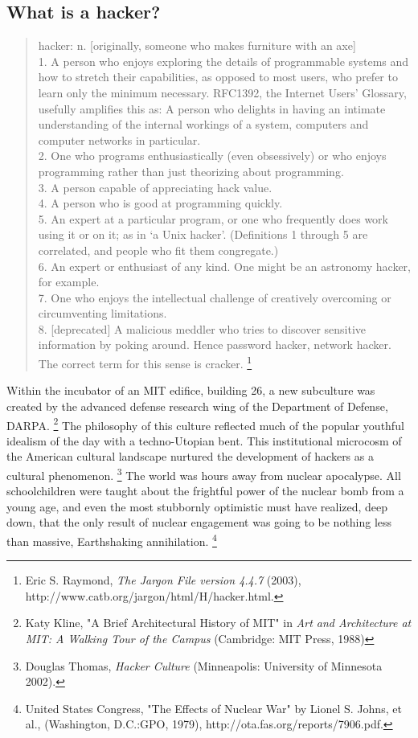 \documentclass[11pt]{article}
\begin{document}
\subsection{What is a hacker?}
\begin{quote}
hacker: n.
    [originally, someone who makes furniture with an axe] \\
    1. A person who enjoys exploring the details of programmable systems and how to stretch their capabilities, as opposed to most users, who prefer to learn only the minimum necessary. RFC1392, the Internet Users' Glossary, usefully amplifies this as: A person who delights in having an intimate understanding of the internal workings of a system, computers and computer networks in particular.\\
    2. One who programs enthusiastically (even obsessively) or who enjoys programming rather than just theorizing about programming. \\
    3. A person capable of appreciating hack value. \\
    4. A person who is good at programming quickly. \\
    5. An expert at a particular program, or one who frequently does work using it or on it; as in ‘a Unix hacker’. (Definitions 1 through 5 are correlated, and people who fit them congregate.) \\
    6. An expert or enthusiast of any kind. One might be an astronomy hacker, for example. \\
    7. One who enjoys the intellectual challenge of creatively overcoming or circumventing limitations. \\
    8. [deprecated] A malicious meddler who tries to discover sensitive information by poking around. Hence password hacker, network hacker. The correct term for this sense is cracker.
    \footnote{Eric S. Raymond, \emph{The Jargon File version 4.4.7} (2003), http://www.catb.org/jargon/html/H/hacker.html.}

\end{quote}

Within the incubator of an MIT edifice, building 26, a new subculture was created by the advanced defense research wing of the Department of Defense, DARPA.
\footnote{Katy Kline, "A Brief Architectural History of MIT" in \emph{Art and Architecture at MIT: A Walking Tour of the Campus} (Cambridge: MIT Press, 1988)}
The philosophy of this culture reflected much of the popular youthful idealism of the day with a techno-Utopian bent. This institutional microcosm of the American cultural landscape nurtured the development of hackers as a cultural phenomenon.
\footnote{Douglas Thomas, \emph{Hacker Culture} (Minneapolis: University of Minnesota 2002).}
The world  was hours away from nuclear apocalypse. All schoolchildren were taught about the frightful power of the nuclear bomb from a young age, and even the most stubbornly optimistic must have realized, deep down, that the only result of nuclear engagement was going to be nothing less than massive, Earthshaking annihilation.
\footnote{United States Congress, "The Effects of Nuclear War" by Lionel S. Johns, et al., (Washington, D.C.:GPO, 1979), http://ota.fas.org/reports/7906.pdf.}
\end{document}
